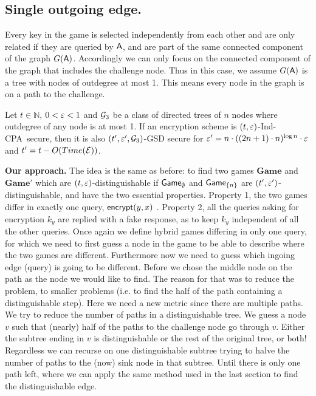 \documentclass{article}
\newcommand{\tcpa}{$(t,\eps)$-Ind-CPA}
\def\A{{\sf A}}
\def\E{{\cal E}}
\newcommand{\encrypt}{{\sf encrypt}}
\newcommand{\game}{{\sf Game}}
\newcommand{\dgame}{{\mathbf{Game}}}
\begin{document}
\subsection{Single outgoing edge.}
Every key in the game is selected independently from each other and are only related if they are queried by $\A$, and are part of the same connected component of the graph $G(\A)$. Accordingly we can only focus on the connected component of the graph that includes the challenge node. Thus in this case, we assume $G(\A)$ is a tree with nodes of outdegree at most 1. This means every node in the graph is on a path to the challenge. \\

\begin{theorem}\label{thm:Min-1out}
Let $t \in \mathbb{N}$, $0<\varepsilon<1$ and ${\cal G}_3$  be a class of directed trees of $n$ nodes where outdegree of any node is at most 1. If an encryption scheme is \tcpa~secure, then it is also $(t',\varepsilon',{\cal G}_3)$-GSD secure for $\varepsilon'=n\cdot ((2n+1)\cdot n)^{\log n} \cdot \varepsilon$ and $t'=t-O(Time(\E))$.
\end{theorem}


\noindent \textbf{Our approach.}
The idea is the same as before: to find two games $\dgame$ and $\dgame'$ which are $(t,\varepsilon)$-distinguishable if $\game_{\emptyset}$ and $\game_{\{n\}}$ are $(t',\varepsilon')$-distinguishable, and have the two essential properties. Property 1, the two games differ in exactly one query, $\encrypt(y,x)$ . Property 2, all the queries asking for encryption $k_y$ are replied with a fake response, as to keep $k_y$ independent of all the other queries. Once again we define hybrid games differing in only one query, for which we need to first guess a node in the game to be able to describe where the two games are different. Furthermore now we need to guess which ingoing edge (query) is  going to be different. Before we chose the middle node on the path as the node  we would like to find. The reason for that was to reduce the problem, to smaller problems (i.e. to find the half of the path containing a distinguishable step). Here we need a new metric since there are multiple paths. We try to reduce the number of paths in a distinguishable tree. We guess a node $v$ such that (nearly) half of the paths to the challenge node go through $v$. Either the subtree ending in $v$ is distinguishable or the rest of the original tree,  or both! Regardless we can recurse on one distinguishable subtree trying to halve the number of paths to the (now) sink node in that subtree. Until there is only one path left, where we can apply the same method used in the last section to find the distinguishable edge. \\
\end{document}
